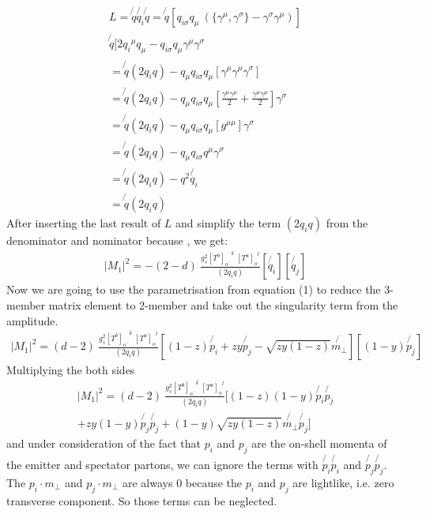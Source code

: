 \begin{equation}
\begin{split}
L=\not{q} \not{q_i} \not{q} =\not{q}[{q_{i\sigma}} q_{\mu} \: (\lbrace{\gamma^{\mu}}, {\gamma^{\sigma}}\rbrace - {\gamma^{\sigma}}{\gamma^{\mu}})]\\ 
\not{q}[2{q_{i}}^{\mu} q_{\mu} - {q_{i\sigma}}q_{\mu}{\gamma^{\mu}}{\gamma^{\sigma}}\\
=\not{q} (2q_i q)-q_{\mu}{q_{i\sigma}}q_{\mu}[{\gamma^{\mu}}{\gamma^{\mu}}{\gamma^{\sigma}}]\\
=\not{q} (2q_i q)-q_{\mu}{q_{i\sigma}}q_{\mu}[\frac{{\gamma^{\mu}}{\gamma^{\mu}}}{2} +\frac{{\gamma^{\mu}}{\gamma^{\mu}}}{2}]{\gamma^{\sigma}}\\
=\not{q} (2q_i q)-q_{\mu}{q_{i\sigma}}q_{\mu}[g^{{\mu}{\mu}}]{\gamma^{\sigma}}\\
=\not{q} (2q_i q)-q_{\mu}{q_{i\sigma}}q^{\mu}{\gamma^{\sigma}}\\
=\not{q} (2q_i q)-q^2 \not{q_i}\\
=\not{q} (2q_i q)
\end{split}
\end{equation}
After inserting the last result of $ L $ and simplify the term $ (2q_i q) $ from the denominator and nominator because , we get:
\begin{equation}
\begin{split}
|M_1|^2=-(2-d)\:\frac{g_s^2  {[T^b]_{o\:^{\prime}}}^k \: {[T^a]_o}^l }{(2q_i q)}
[\not{q_i}]
[\not{q_j}]
\end{split}
\end{equation}
Now we are going to use the parametrisation from equation (1) to reduce the 3-member matrix element to 2-member and take out the singularity term from the amplitude.
\begin{equation}
\begin{split}
|M_1|^2=(d-2)\:\frac{g_s^2  {[T^b]_{o\:^{\prime}}}^k \: {[T^a]_o}^l }{(2q_i q)}
[(1-z) \not{p_i}+zy \not{p_j} - \sqrt{zy(1-z)} \not{{m}_{\bot}}]
[(1-y) \not{p_j}]
\end{split}
\end{equation}
Multiplying the both sides 
\begin{equation}
\begin{split}
|M_1|^2=(d-2)\:\frac{g_s^2  {[T^b]_{o\:^{\prime}}}^k \: {[T^a]_o}^l }{(2q_i q)}
[(1-z)(1-y) \not{p_i}\not{p_j} \\
+zy(1-y) \not{p_j}\not{p_j} + (1-y)\sqrt{zy(1-z)} \not{{m}_{\bot}}\not{p_j}]
\end{split}
\end{equation}
and under consideration of the fact that $ p_i $ and $ p_j $ are the on-shell momenta of the emitter and spectator partons, we can ignore the terms with $ \not{p_i} \not{p_i} $ and $ \not{p_j} \not{p_j} $.
The $ {p_i} \cdot  {m}_{\bot} $ and $ {p_j} \cdot  {m}_{\bot} $ are always $ 0 $ because the $ p_i $ and $ p_j $ are lightlike, i.e. zero transverse component. So those terms can be neglected.


